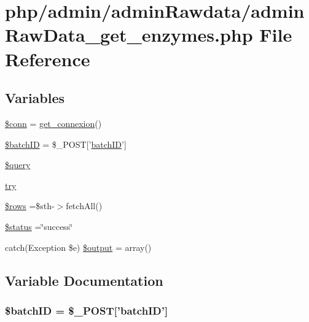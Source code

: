 \hypertarget{admin_rawdata_2admin_raw_data__get__enzymes_8php}{\section{php/admin/admin\-Rawdata/admin\-Raw\-Data\-\_\-get\-\_\-enzymes.php File Reference}
\label{admin_rawdata_2admin_raw_data__get__enzymes_8php}
}
\subsection*{Variables}
\begin{DoxyCompactItemize}
\item 
\hyperlink{admin_rawdata_2admin_raw_data__get__enzymes_8php_aa8a5a87b9c1a6a0819b88447cbe41877}{\$conn} = \hyperlink{php__functions_8php_ace18bc10f3fd08f92688ac743e0d8c2e}{get\-\_\-connexion}()
\item 
\hyperlink{admin_rawdata_2admin_raw_data__get__enzymes_8php_aaa6d122ea9cb55b210aadd86e5654a74}{\$batch\-I\-D} = \$\-\_\-\-P\-O\-S\-T\mbox{[}'\hyperlink{obsolete_2processing__bak_8php_a88c5bc4262b7c34f236357f5c53fc99b}{batch\-I\-D}'\mbox{]}
\item 
\hyperlink{admin_rawdata_2admin_raw_data__get__enzymes_8php_af59a5f7cd609e592c41dc3643efd3c98}{\$query}
\item 
\hyperlink{admin_rawdata_2admin_raw_data__get__enzymes_8php_abe4cc9788f52e49485473dc699537388}{try}
\item 
\hyperlink{admin_rawdata_2admin_raw_data__get__enzymes_8php_ace2ec39e7df3899fa8df9640ec274b03}{\$rows} =\$sth-\/$>$fetch\-All()
\item 
\hyperlink{admin_rawdata_2admin_raw_data__get__enzymes_8php_a58391ea75f2d29d5d708d7050b641c33}{\$status} =\char`\"{}success\char`\"{}
\item 
catch(Exception \$e) \hyperlink{admin_rawdata_2admin_raw_data__get__enzymes_8php_adeea971a3fd99fcce189bd638dacd58c}{\$output} = array()
\end{DoxyCompactItemize}


\subsection{Variable Documentation}
\hypertarget{admin_rawdata_2admin_raw_data__get__enzymes_8php_aaa6d122ea9cb55b210aadd86e5654a74}{
\subsubsection[{\$batch\-I\-D}]{\setlength{\rightskip}{0pt plus 5cm}\${\bf batch\-I\-D} = \$\-\_\-\-P\-O\-S\-T\mbox{[}'{\bf batch\-I\-D}'\mbox{]}}}\label{admin_rawdata_2admin_raw_data__get__enzymes_8php_aaa6d122ea9cb55b210aadd86e5654a74}


